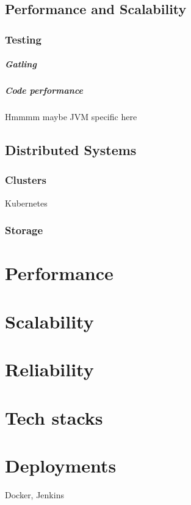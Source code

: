 \documentclass[a4paper, 11pt]{book}
\begin{document}
    \section{Performance and Scalability}

    \subsection{Testing}

    \paragraph{Gatling}

    \paragraph{Code performance}
    Hmmmm maybe JVM specific here


    \section{Distributed Systems}

    \subsection{Clusters}
    Kubernetes

    \subsection{Storage}


    \chapter{Performance}


    \chapter{Scalability}


    \chapter{Reliability}


    \chapter{Tech stacks}


    \chapter{Deployments}
    Docker, Jenkins
\end{document}
